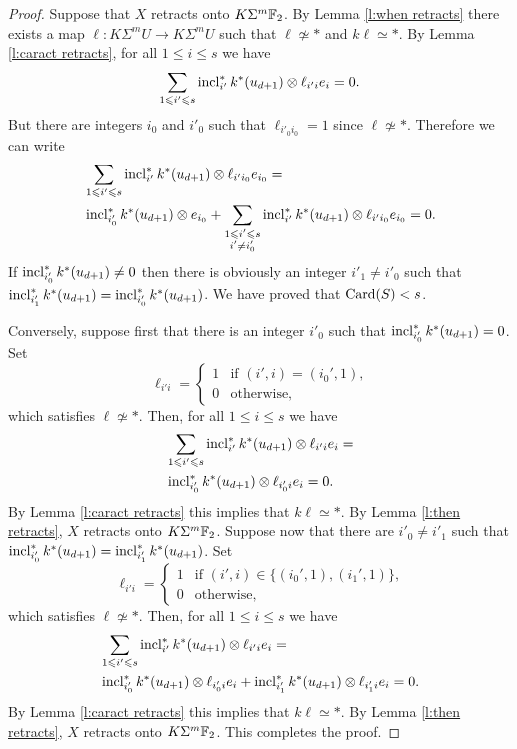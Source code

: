 \begin{proof} %
Suppose that $X$ retracts onto $K\Sigma^m\mathbb{F}_2$. By Lemma \ref{l:when retracts} there exists a map $\ell:K\Sigma^mU\to K\Sigma^mU$ such that $\ell\not\simeq *$ and $k\ell\simeq *$. By Lemma \ref{l:caract retracts}, for all $1\leq i\leq s$ we have
$$
\sum_{1\leqslant i'\leqslant s}\operatorname{incl}_{i'}^*k^*(u_{d+1})\otimes\ell_{i'i}e_i=0.
$$ But there are integers $i_0$ and $i'_0$ such that $\ell_{i'_0i_0}=1$ since $\ell\not\simeq *$. Therefore we can write
\begin{align*}
&\sum_{1\leqslant i'\leqslant s}\operatorname{incl}_{i'}^*k^*(u_{d+1})\otimes\ell_{i'i_0}e_{i_0}=\\
&\operatorname{incl}_{i'_0}^*k^*(u_{d+1})\otimes e_{i_0}+\sum_{\substack{1\leqslant i'\leqslant s\\ i'\not=i'_0}}\operatorname{incl}_{i'}^*k^*(u_{d+1})\otimes\ell_{i'i_0}e_{i_0}=0.
\end{align*} If $\operatorname{incl}_{i'_0}^*k^*(u_{d+1})\not=0$ then there is obviously an integer $i'_1\not=i'_0$ such that $\operatorname{incl}_{i'_1}^*k^*(u_{d+1})=\operatorname{incl}_{i'_0}^*k^*(u_{d+1})$. We have proved that $\operatorname{Card}(S)<s$. 

Conversely, suppose first that there is an integer $i'_0$ such that $\operatorname{incl}_{i'_0}^*k^*(u_{d+1})=0$. Set 
$$\ell_{i'i}=\begin{cases}
1 &\text{if $(i',i)=(i_0',1)$,}\\
0 &\text{otherwise,}
\end{cases}$$
which satisfies $\ell\not\simeq *$. Then, for all $1\leq i\leq s$ we have
\begin{align*}
&\sum_{1\leqslant i'\leqslant s}\operatorname{incl}_{i'}^*k^*(u_{d+1})\otimes\ell_{i'i}e_i=\\
&\operatorname{incl}_{i_0'}^*k^*(u_{d+1})\otimes\ell_{i_0'i}e_i=0.
\end{align*}
By Lemma \ref{l:caract retracts} this implies that $k\ell\simeq*$. By Lemma \ref{l:then retracts}, $X$ retracts onto $K\Sigma^m\mathbb{F}_2$. Suppose now that there are $i'_0\not=i'_1$ such that $\operatorname{incl}_{i'_0}^*k^*(u_{d+1})=\operatorname{incl}_{i'_1}^*k^*(u_{d+1})$. Set 
$$\ell_{i'i}=\begin{cases}
1 &\text{if $(i',i)\in\{(i_0',1),(i_1',1)\}$,}\\
0 &\text{otherwise,}
\end{cases}$$
which satisfies $\ell\not\simeq *$. Then, for all $1\leq i\leq s$ we have
\begin{align*}
&\sum_{1\leqslant i'\leqslant s}\operatorname{incl}_{i'}^*k^*(u_{d+1})\otimes\ell_{i'i}e_i=\\
&\operatorname{incl}_{i_0'}^*k^*(u_{d+1})\otimes\ell_{i_0'i}e_i+\operatorname{incl}_{i_1'}^*k^*(u_{d+1})\otimes\ell_{i_1'i}e_i=0.
\end{align*}
By Lemma \ref{l:caract retracts} this implies that $k\ell\simeq*$. By Lemma \ref{l:then retracts}, $X$ retracts onto $K\Sigma^m\mathbb{F}_2$. This completes the proof.
\end{proof}

